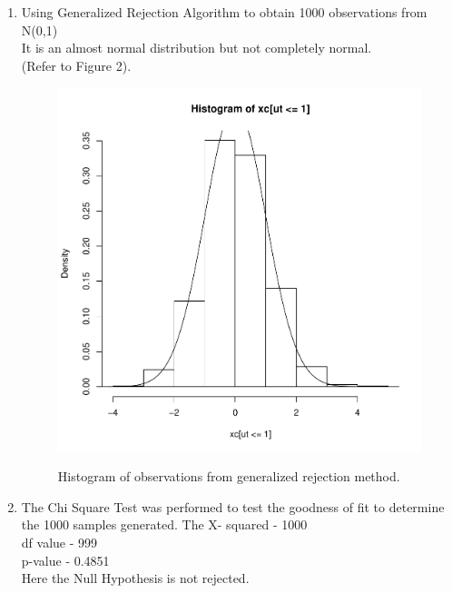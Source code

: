 \documentclass[11pt]{article}
\begin{document}
\begin{enumerate}
\begin{enumerate}
\item Using Generalized Rejection Algorithm to obtain 1000 observations from N(0,1)\\
It is an almost normal distribution but not completely normal.\\ 
(Refer to Figure 2).\footnotemark 
			 \\
\begin{figure}[h]
	\caption[Figure2]{Histogram of observations from generalized rejection method.}
    \centering
     \includegraphics[scale=0.4]{1bq.pdf}
      \label{fig2}			
\end{figure}


\item The Chi Square Test was performed to test the goodness of fit to determine the 1000 samples generated.\footnotemark 
The X- squared - 1000\\
df value - 999\\
p-value - 0.4851\\
Here the Null Hypothesis is not rejected.\\
 

\end{enumerate}






\end{enumerate}
\end{document}
